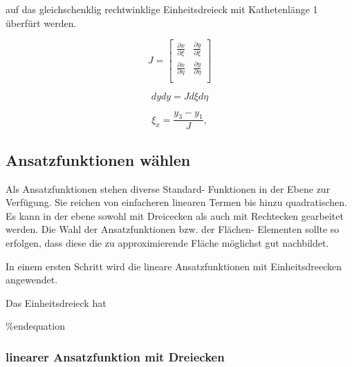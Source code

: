 auf das gleichschenklig rechtwinklige Einheitsdreieck mit Kathetenlänge 1 überfürt werden.

\begin{equation}
			J = \left[ \begin{array}{rr}
\frac{\partial x}{\partial \xi} & \frac{\partial y}{\partial \xi}  \\
\frac{\partial x}{\partial \eta} & \frac{\partial y}{\partial \eta}  \\
\end{array}\right] 
			\label{fem:JocobiDeterminante}
\end{equation}

\begin{equation}
			dy dy = J d\xi d\eta
			\label{fem:newTransformation}
\end{equation}

\begin{equation}
			\xi_x = \frac{y_3 - y_1}{J}, 
			\label{fem:newTransformation}
\end{equation}

\subsection{Ansatzfunktionen wählen}

Als Ansatzfunktionen stehen diverse Standard- Funktionen in der Ebene zur Verfügung. Sie reichen von einfacheren linearen Termen bis hinzu quadratischen. Es kann in der ebene sowohl mit Dreicecken als auch mit Rechtecken gearbeitet werden. Die Wahl der Ansatzfunktionen bzw. der Flächen- Elementen sollte so erfolgen, dass diese die zu approximierende Fläche möglichst gut nachbildet.

In einem ersten Schritt wird die lineare Ansatzfunktionen mit Einheitsdreecken angewendet.

Das Einheitsdreieck hat 


\%end{equation}


\subsubsection{linearer Ansatzfunktion mit Dreiecken
\label{fem:subsection:bonorum}}

